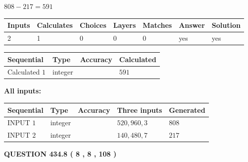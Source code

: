 \documentclass{ctexart}
\begin{document}
 

$ %
808 -  %
217=   %
591$
 
 
\noindent{}
 
 

 
   
   
   
   
\noindent\begin{tabular}{|l|l|l|l|l|l|l|}
 \hline
Inputs & Calculates & Choices & Layers & Matches & Answer & Solution \\ \hline
 2  & 
 1  & 
 0
  & 
 0  & 
 0  & 
  yes & 
  yes 
  \\ \hline
 \end{tabular}
   
   
   
   
\noindent{}
   
   
  
  
\noindent\begin{tabular}{|l|l|l|l|}
\hline
 Sequential & Type & Accuracy & Calculated \\ 
\hline
 
 
  Calculated $  1 $ & integer &  & 
  $ 591 $ 
 \\  \hline  
 \end{tabular}
   
   
   
   
\noindent\vspace{0.1in}\hspace{-0.08in} {\textbf{\Large{All inputs: }}}
   
   
  
  
\noindent\begin{tabular}{|l|l|l|l|l|}
\hline
 Sequential & Type & Accuracy & Three inputs & Generated \\ 
\hline
 
 
  INPUT $  1 $ & integer &  & $
 520
 , 
 960
 , 
 3
 $ & $ 808 $ 
 \\  \hline  
 
 
  INPUT $  2 $ & integer &  & $
 140
 , 
 480
 , 
 7
 $ & $ 217 $ 
 \\  \hline  
 \end{tabular}
   
   
  
\vspace{0.2in}
  
{\textbf{\Large{QUESTION
434.8 
 ( 8 , 8 , 108 )
}}}
  
\end{document}

